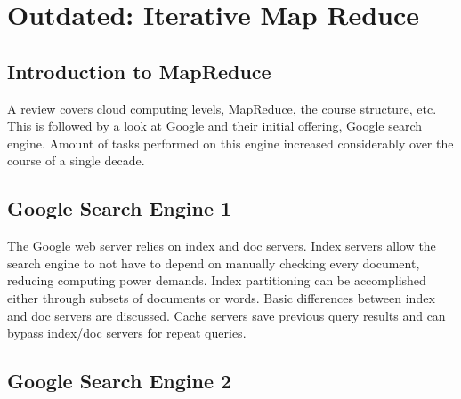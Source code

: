 \chapter{Outdated: Iterative Map Reduce}
\label{sec:icloud-iterative-mapreduce}

\FILENAME


\section{Introduction to MapReduce}

A review covers cloud computing levels, MapReduce, the course structure,
etc. This is followed by a look at Google and their initial offering,
Google search engine. Amount of tasks performed on this engine increased
considerably over the course of a single decade.



\section{Google Search Engine 1}

The Google web server relies on index and doc servers. Index servers
allow the search engine to not have to depend on manually checking every
document, reducing computing power demands. Index partitioning can be
accomplished either through subsets of documents or words. Basic
differences between index and doc servers are discussed. Cache servers
save previous query results and can bypass index/doc servers for repeat
queries.




\section{Google Search Engine 2}

